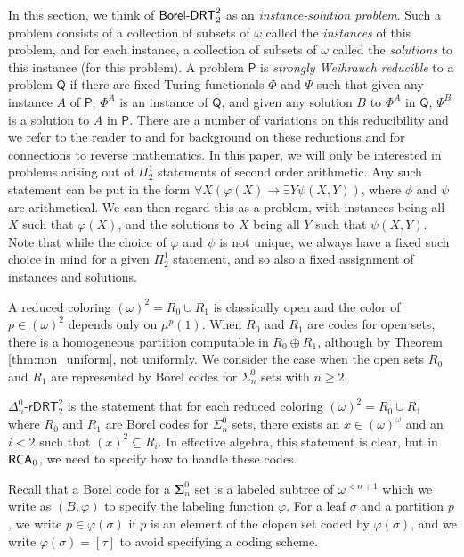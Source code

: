 \documentclass{amsart}
\theoremstyle{definition}
\theoremstyle{remark}
\newcommand{\system}[1]{\mbox{\fontfamily{cmss}\fontshape{n}\fontseries{m}%
    \selectfont#1}}
\newcommand{\RCA}{\system{RCA}\ensuremath{_0}}
\newcommand{\BoDRT}{\system{Borel-DRT}}
\begin{document}
In this section, we think of $\BoDRT^2_2$ as an \emph{instance-solution problem}. Such a problem consists of a collection of subsets of 
$\omega$ called the \emph{instances} of this problem, and for each instance, a collection of subsets of $\omega$ called the \emph{solutions} to this instance 
(for this problem). A problem $\mathsf{P}$ is \emph{strongly Weihrauch reducible} to a problem $\mathsf{Q}$ if there are fixed Turing functionals $\Phi$ and $\Psi$ such 
that given any instance $A$ of $\mathsf{P}$, $\Phi^A$ is an instance of $\mathsf{Q}$, and given any solution $B$ to $\Phi^A$ in $\mathsf{Q}$, $\Psi^B$ is a solution to 
$A$ in $\mathsf{P}$. There are a number of variations on this reducibility and we refer to the reader to \cite{Dzhafarov-2015ta} and \cite{HJ-2015ta} for background on 
these reductions and for connections to reverse mathematics. In this paper, we will only be interested in problems arising out of $\Pi^1_2$ statements of second order 
arithmetic. Any such statement can be put in the form $\forall X(\varphi(X) \to \exists Y \psi(X,Y))$, where $\phi$ and $\psi$ are arithmetical. We can then regard this as a 
problem, with instances being all $X$ such that $\varphi(X)$, and the solutions to $X$ being all $Y$ such that $\psi(X,Y)$. Note that while the choice of $\varphi$ and $\psi$ 
is not unique, we always have a fixed such choice in mind for a given $\Pi^1_2$ statement, and so also a fixed assignment of instances and solutions.

A reduced coloring $(\omega)^2 = R_0 \cup R_1$ is classically open and the color of $p \in (\omega)^2$ depends only on $\mu^p(1)$. When $R_0$ and $R_1$ are 
codes for open sets, there is a homogeneous partition computable in $R_0 \oplus R_1$, although by Theorem \ref{thm:non_uniform}, 
not uniformly. We consider the case when the open sets $R_0$ and $R_1$ are represented by Borel codes for $\Sigma^0_n$ sets with $n \geq 2$. 

$\Delta^0_n$-$\mathsf{rDRT}^2_2$ is the statement that for each reduced coloring $(\omega)^2 = R_0 \cup R_1$ where $R_0$ and $R_1$ are Borel codes 
for $\Sigma^0_n$ sets, there exists an $x \in (\omega)^\omega$ and an $i < 2$ such that $(x)^2 \subseteq R_i$. In effective algebra, this statement is 
clear, but in $\RCA$, we need to specify how to handle these codes. 

Recall that a Borel code for a $\mathbf \Sigma^0_n$ set is a labeled subtree of $\omega^{< n+1}$ which we write as $(B,\varphi)$ to specify the labeling function $\varphi$. 
For a leaf $\sigma$ and a partition $p$, we write $p \in \varphi(\sigma)$ if $p$ is an element of the clopen set coded by $\varphi(\sigma)$, and we write $\varphi(\sigma) = [\tau]$ to avoid specifying a coding scheme. 
\end{document}
